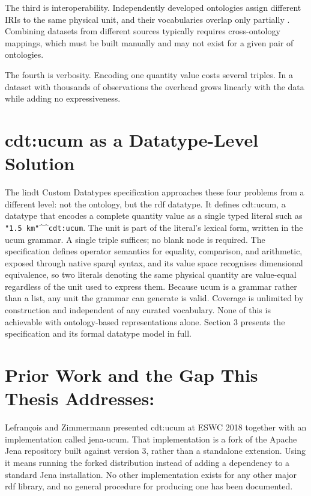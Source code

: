 The third is interoperability. Independently developed ontologies assign different IRIs to the same physical unit, and their vocabularies overlap only partially \cite{keil2018comparison}. Combining datasets from different sources typically requires cross-ontology mappings, which must be built manually and may not exist for a given pair of ontologies.

The fourth is verbosity. Encoding one quantity value costs several triples. In a dataset with thousands of observations the overhead grows linearly with the data while adding no expressiveness.

\section{cdt:ucum as a Datatype-Level Solution}
The \ac{lindt} Custom Datatypes specification approaches these four problems from a different level: not the ontology, but the \ac{rdf} datatype. It defines cdt:ucum, a datatype that encodes a complete quantity value as a single typed literal such as \texttt{"1.5 km"}\^{}\^{}\texttt{cdt:ucum}. The unit is part of the literal's lexical form, written in the \ac{ucum} grammar. A single triple suffices; no blank node is required. The specification defines operator semantics for equality, comparison, and arithmetic, exposed through native \ac{sparql} syntax, and its value space recognises dimensional equivalence, so two literals denoting the same physical quantity are value-equal regardless of the unit used to express them. Because \ac{ucum} is a grammar rather than a list, any unit the grammar can generate is valid. Coverage is unlimited by construction and independent of any curated vocabulary. None of this is achievable with ontology-based representations alone. Section 3 presents the specification and its formal datatype model in full.


\section{Prior Work and the Gap This Thesis Addresses:} Lefrançois and Zimmermann \cite{lefranccois2018unified} presented cdt:ucum at ESWC 2018 together with an implementation called jena-ucum. That implementation is a fork of the Apache Jena repository built against version 3, rather than a standalone extension. Using it means running the forked distribution instead of adding a dependency to a standard Jena installation. No other implementation exists for any other major \ac{rdf} library, and no general procedure for producing one has been documented.



